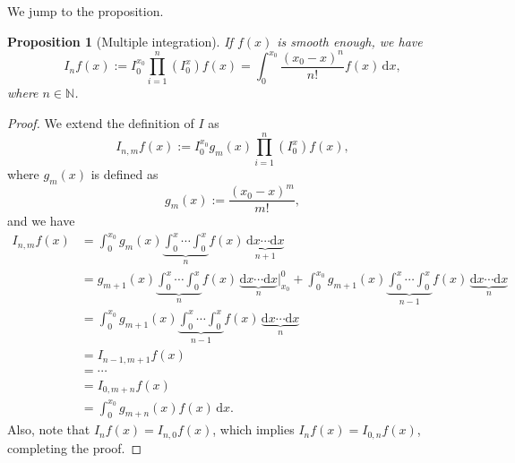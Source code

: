 \documentclass{article}
\newtheorem{prop}[lemma]{Proposition}
\begin{document}
We jump to the proposition.
\begin{prop}[Multiple integration]
  If $f(x)$ is smooth enough, we have
  \begin{equation}
    I_n f(x) \mathrel{:=}
    I_0^{x_0} \prod_{i = 1}^n (I_0^x) f(x) =
    \int_0^{x_0} \frac{(x_0 - x)^n}{n!} f(x) \, \mathrm{d} x,
  \end{equation}
  where $n \in \mathbb{N}$.
\end{prop}
\begin{proof}
  We extend the definition of $I$ as
  \begin{equation}
    I_{n, m} f(x) \mathrel{:=}
    I_0^{x_0} g_m(x) \prod_{i = 1}^n (I_0^x) f(x),
  \end{equation}
  where $g_m(x)$ is defined as
  \begin{equation}
    g_m(x) \mathrel{:=} \frac{(x_0 - x)^m}{m!},
  \end{equation}
  and we have
  \[\begin{aligned}
    I_{n, m} f(x) &=
    \int_0^{x_0} g_m(x)
    \underbrace{\int_0^x \! \cdots \int_0^x}_n f(x)
    \, \underbrace{\mathrm{d} x \cdots \mathrm{d} x}_{n + 1} \\
    &= g_{m + 1}(x)
    \underbrace{\int_0^x \! \cdots \int_0^x}_n f(x)
    \, \underbrace{\mathrm{d} x \cdots \mathrm{d} x}_{n} \biggr\rvert_{x_0}^0 +
    \int_0^{x_0} \! g_{m + 1}(x) \underbrace{\int_0^x \! \cdots \int_0^x}_{n - 1} f(x)
    \, \underbrace{\mathrm{d} x \cdots \mathrm{d} x}_{n} \\
    &= \int_0^{x_0} g_{m + 1}(x) \underbrace{\int_0^x \! \cdots \int_0^x}_{n - 1}
    f(x) \, \underbrace{\mathrm{d} x \cdots \mathrm{d} x}_{n} \\
    &= I_{n - 1, m + 1} f(x) \\
    &= \cdots \\
    &= I_{0, m + n} f(x) \\
    &= \int_0^{x_0} g_{m + n}(x) f(x) \, \mathrm{d} x.
  \end{aligned}\]
  Also, note that $I_n f(x) = I_{n, 0} f(x)$, which implies
  $I_n f(x) = I_{0, n} f(x)$, completing the proof.
\end{proof}
\end{document}
